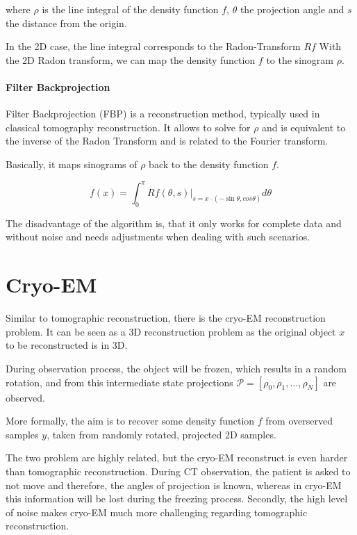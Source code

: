 where $\rho$ is the line integral of the density function $f$, $\theta$ the projection angle and $s$ the distance from the origin.

In the 2D case, the line integral corresponds to the Radon-Transform $Rf$
With the 2D Radon transform, we can map the density function $f$ to the sinogram $\rho$. 

\paragraph{Filter Backprojection}
\label{sec:filterBackProjection}
Filter Backprojection (FBP) is a reconstruction method, typically used in classical tomography reconstruction.
It allows to solve for $\rho$ and is equivalent to the inverse of the Radon Transform
and is related to the Fourier transform. 

Basically, it maps sinograms of $\rho$ back to the density function $f$.

\begin{equation}
    f(x) = \int_{0}^{\pi} Rf(\theta, s) |_{s=x \cdot (- \sin \theta, cos \theta) } d \theta
\end{equation}

The disadvantage of the algorithm is, that it only works for complete data and without noise
and needs adjustments when dealing with such scenarios. 

\section{Cryo-EM}
Similar to tomographic reconstruction, there is the cryo-EM reconstruction problem\cite{cryoEmMath}.
It can be seen as a 3D reconstruction problem as the original object $x$ to be reconstructed is in 3D.

During observation process, the object will be frozen, which results in a random rotation, and from this intermediate state 
projections $\mathcal{P}=[\rho_0, \rho_1, \dots, \rho_N]$ are observed.

More formally, the aim is to recover some density function $f$ from overserved samples $y$, taken from 
randomly rotated, projected 2D samples.

The two problem are highly related, but the cryo-EM reconstruct is even harder than tomographic reconstruction.
During CT observation, the patient is asked to not move and therefore, the angles of projection is known, whereas
in cryo-EM this information will be lost during the freezing process.
Secondly, the high level of noise makes cryo-EM much more challenging regarding tomographic reconstruction.

